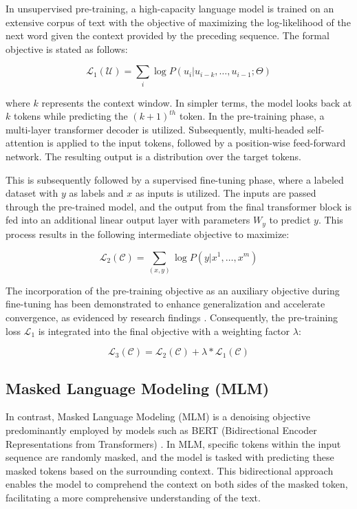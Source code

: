 In unsupervised pre-training, a high-capacity language model is trained on an extensive corpus of text with the objective of maximizing the log-likelihood of the next word given the context provided by the preceding sequence. The formal objective is stated as follows:

\begin{equation}
    \mathcal{L}_1(\mathcal{U}) = \sum_{i} \log P(u_i | u_{i-k}, \ldots, u_{i-1}; \Theta)
\end{equation}

where \( k \) represents the context window. In simpler terms, the model looks back at \( k \) tokens while predicting the \((k+1)^{th}\) token. In the pre-training phase, a multi-layer transformer decoder is utilized. Subsequently, multi-headed self-attention is applied to the input tokens, followed by a position-wise feed-forward network. The resulting output is a distribution over the target tokens.

This is subsequently followed by a supervised fine-tuning phase, where a labeled dataset with \( y \) as labels and \( x \) as inputs is utilized. The inputs are passed through the pre-trained model, and the output from the final transformer block is fed into an additional linear output layer with parameters \( W_y \) to predict \( y \). This process results in the following intermediate objective to maximize:

\begin{equation}
    \mathcal{L}_2(\mathcal{C}) = \sum_{(x,y)} \log P(y | x^1, \ldots, x^m)
\end{equation}

The incorporation of the pre-training objective as an auxiliary objective during fine-tuning has been demonstrated to enhance generalization and accelerate convergence, as evidenced by research findings \cite{radford2018improving}. Consequently, the pre-training loss \( \mathcal{L}_1 \) is integrated into the final objective with a weighting factor \( \lambda \):

\begin{equation}
    \mathcal{L}_3(\mathcal{C}) = \mathcal{L}_2(\mathcal{C}) + \lambda \ast \mathcal{L}_1(\mathcal{C})
\end{equation}
 
\subsection{Masked Language Modeling (MLM)}

In contrast, Masked Language Modeling (MLM) is a denoising objective predominantly employed by models such as BERT (Bidirectional Encoder Representations from Transformers) \cite{devlin2018bert}. In MLM, specific tokens within the input sequence are randomly masked, and the model is tasked with predicting these masked tokens based on the surrounding context. This bidirectional approach enables the model to comprehend the context on both sides of the masked token, facilitating a more comprehensive understanding of the text.

